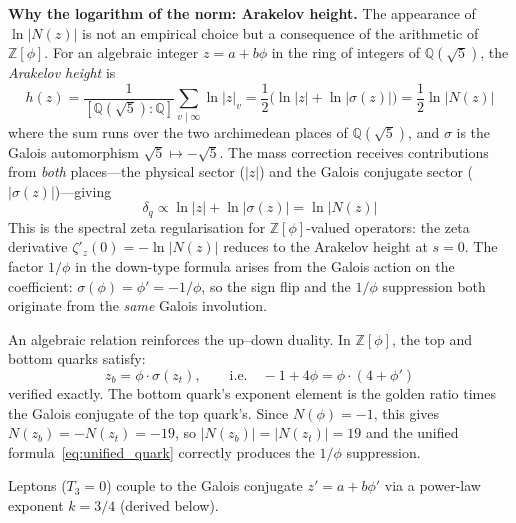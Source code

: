 \documentclass[12pt,a4paper]{article}
\theoremstyle{definition}
\begin{document}
\textbf{Why the logarithm of the norm: Arakelov height.}  The appearance of $\ln|N(z)|$ is not an empirical choice but a consequence of the arithmetic of $\mathbb{Z}[\phi]$.  For an algebraic integer $z = a + b\phi$ in the ring of integers of $\mathbb{Q}(\sqrt{5})$, the \emph{Arakelov height} is
\begin{equation}
h(z) = \frac{1}{[\mathbb{Q}(\sqrt{5}):\mathbb{Q}]} \sum_{v \mid \infty} \ln|z|_v
= \frac{1}{2}\bigl(\ln|z| + \ln|\sigma(z)|\bigr)
= \frac{1}{2}\ln|N(z)|
\label{eq:arakelov}
\end{equation}
where the sum runs over the two archimedean places of $\mathbb{Q}(\sqrt{5})$, and $\sigma$ is the Galois automorphism $\sqrt{5} \mapsto -\sqrt{5}$.  The mass correction receives contributions from \emph{both} places---the physical sector ($|z|$) and the Galois conjugate sector ($|\sigma(z)|$)---giving
\begin{equation}
\delta_q \propto \ln|z| + \ln|\sigma(z)| = \ln|N(z)|
\end{equation}
This is the spectral zeta regularisation for $\mathbb{Z}[\phi]$-valued operators: the zeta derivative $\zeta'_z(0) = -\ln|N(z)|$ reduces to the Arakelov height at $s = 0$.  The factor $1/\phi$ in the down-type formula arises from the Galois action on the coefficient: $\sigma(\phi) = \phi' = -1/\phi$, so the sign flip and the $1/\phi$ suppression both originate from the \emph{same} Galois involution.

An algebraic relation reinforces the up--down duality.  In $\mathbb{Z}[\phi]$, the top and bottom quarks satisfy:
\begin{equation}
z_b = \phi \cdot \sigma(z_t), \qquad \text{i.e.} \quad -1 + 4\phi = \phi \cdot (4 + \phi')
\label{eq:zb_zt}
\end{equation}
verified exactly.  The bottom quark's exponent element is the golden ratio times the Galois conjugate of the top quark's.  Since $N(\phi) = -1$, this gives $N(z_b) = -N(z_t) = -19$, so $|N(z_b)| = |N(z_t)| = 19$ and the unified formula~\eqref{eq:unified_quark} correctly produces the $1/\phi$ suppression.

Leptons ($T_3 = 0$) couple to the Galois conjugate $z' = a + b\phi'$ via a power-law exponent $k = 3/4$ (derived below).
\end{document}
